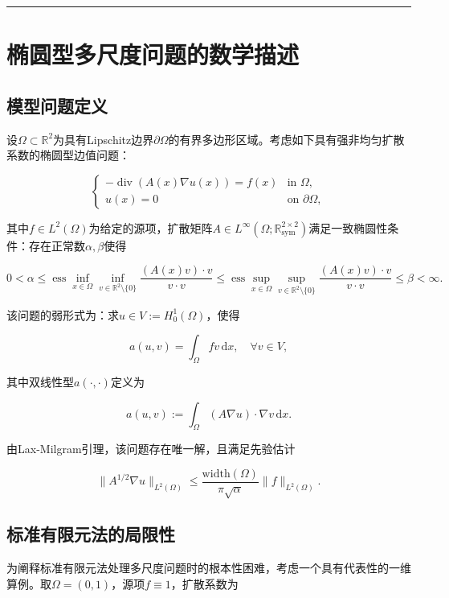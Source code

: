 \documentclass[
]{article}
\begin{document}
\begin{center}\rule{0.5\linewidth}{0.5pt}\end{center}

\section{椭圆型多尺度问题的数学描述}\label{chap-2}

\subsection{模型问题定义}\label{chap-2-1}

设\(\Omega \subset \mathbb{R}^2\)为具有Lipschitz边界\(\partial\Omega\)的有界多边形区域。考虑如下具有强非均匀扩散系数的椭圆型边值问题：

\[
\begin{cases}
-\operatorname{div}(A(x)\nabla u(x)) = f(x) & \text{in } \Omega, \\
u(x) = 0 & \text{on } \partial\Omega,
\end{cases}
\]

其中\(f \in L^2(\Omega)\)为给定的源项，扩散矩阵\(A \in L^\infty(\Omega; \mathbb{R}^{2\times 2}_{\mathrm{sym}})\)满足一致椭圆性条件：存在正常数\(\alpha, \beta\)使得

\[
0 < \alpha \leq \operatorname{ess}\inf_{x\in\Omega} \inf_{v\in\mathbb{R}^2\setminus\{0\}} \frac{(A(x)v)\cdot v}{v\cdot v} \leq \operatorname{ess}\sup_{x\in\Omega} \sup_{v\in\mathbb{R}^2\setminus\{0\}} \frac{(A(x)v)\cdot v}{v\cdot v} \leq \beta < \infty.
\]

该问题的弱形式为：求\(u \in V := H_0^1(\Omega)\)，使得

\[
a(u, v) = \int_\Omega f v \, \mathrm{d}x, \quad \forall v \in V,
\]

其中双线性型\(a(\cdot, \cdot)\)定义为

\[
a(u, v) := \int_\Omega (A\nabla u) \cdot \nabla v \, \mathrm{d}x.
\]

由Lax-Milgram引理，该问题存在唯一解，且满足先验估计

\[
\|A^{1/2}\nabla u\|_{L^2(\Omega)} \leq \frac{\mathrm{width}(\Omega)}{\pi\sqrt{\alpha}} \|f\|_{L^2(\Omega)}.
\]

\subsection{标准有限元法的局限性}\label{chap-2-2}

为阐释标准有限元法处理多尺度问题时的根本性困难，考虑一个具有代表性的一维算例。取\(\Omega = (0,1)\)，源项\(f \equiv 1\)，扩散系数为
\end{document}
